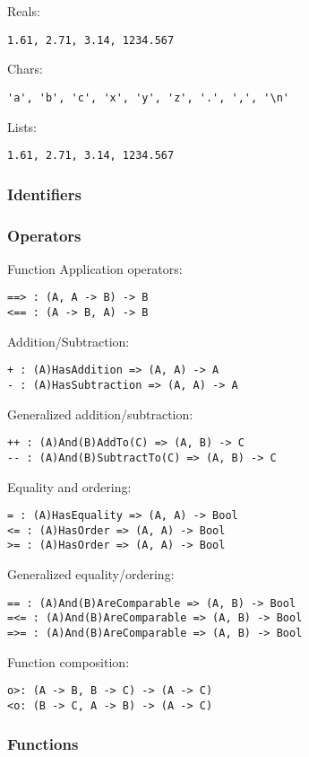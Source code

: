\documentclass{article}
\begin{document}
Reals:
\begin{verbatim}
1.61, 2.71, 3.14, 1234.567 
\end{verbatim}

Chars:
\begin{verbatim}
'a', 'b', 'c', 'x', 'y', 'z', '.', ',', '\n'
\end{verbatim}

Lists:
\begin{verbatim}
1.61, 2.71, 3.14, 1234.567 
\end{verbatim}


\subsubsection{Identifiers}

\subsubsection{Operators}

Function Application operators: 
\begin{verbatim}
==> : (A, A -> B) -> B
<== : (A -> B, A) -> B
\end{verbatim}
Addition/Subtraction:
\begin{verbatim}
+ : (A)HasAddition => (A, A) -> A
- : (A)HasSubtraction => (A, A) -> A
\end{verbatim}
Generalized addition/subtraction:
\begin{verbatim}
++ : (A)And(B)AddTo(C) => (A, B) -> C
-- : (A)And(B)SubtractTo(C) => (A, B) -> C
\end{verbatim}
Equality and ordering:
\begin{verbatim}
= : (A)HasEquality => (A, A) -> Bool
<= : (A)HasOrder => (A, A) -> Bool
>= : (A)HasOrder => (A, A) -> Bool
\end{verbatim}
Generalized equality/ordering:
\begin{verbatim}
== : (A)And(B)AreComparable => (A, B) -> Bool
=<= : (A)And(B)AreComparable => (A, B) -> Bool
=>= : (A)And(B)AreComparable => (A, B) -> Bool
\end{verbatim}
Function composition:
\begin{verbatim}
o>: (A -> B, B -> C) -> (A -> C)
<o: (B -> C, A -> B) -> (A -> C)
\end{verbatim}

\subsubsection{Functions}
\end{document}
